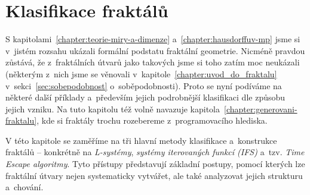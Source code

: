 \chapter{Klasifikace fraktálů}\label{chapter:klasifikace-fraktalu}

S kapitolami~\ref{chapter:teorie-miry-a-dimenze} a~\ref{chapter:hausdorffuv-mp} jsme si v~jistém rozsahu ukázali formální podstatu fraktální geometrie. Nicméně pravdou zůstává, že z~fraktálních útvarů jako takových jsme si toho zatím moc neukázali (některým z~nich jsme se věnovali v~kapitole~\ref{chapter:uvod_do_fraktalu} v~sekci~\ref{sec:sobepodobnost} o~soběpodobnosti). Proto se nyní podíváme na některé další příklady a~především jejich podrobnější klasifikaci dle způsobu jejich vzniku. Na tuto kapitolu též volně navazuje kapitola~\ref{chapter:generovani-fraktalu}, kde si fraktály trochu rozebereme z~programovacího hlediska.

V této kapitole se zaměříme na tři hlavní metody klasifikace a~konstrukce fraktálů -- konkrétně na \emph{L-systémy}, \emph{systémy iterovaných funkcí (IFS)} a~tzv. \emph{Time Escape algoritmy}. Tyto přístupy představují základní postupy, pomocí kterých lze fraktální útvary nejen systematicky vytvářet, ale také analyzovat jejich strukturu a~chování.



